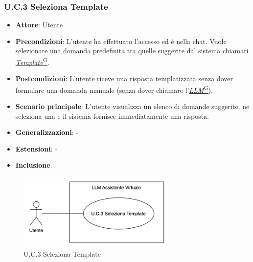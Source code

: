 \subsubsection{U.C.3 Seleziona Template}
\begin{itemize}
    \item \textbf{Attore}: Utente
    \item \textbf{Precondizioni}: L'utente ha effettuato l'accesso ed è nella chat. Vuole selezionare una domanda predefinita tra quelle suggerite dal sistema chiamati \href{https://code7crusaders.github.io/docs/RTB/documentazione_interna/glossario.html#template}{\textit{Template}\textsuperscript{G}}. 
    \item \textbf{Postcondizioni}: L'utente riceve una risposta templatizzata senza dover formulare una domanda manuale (senza dover chiamare l’\href{https://code7crusaders.github.io/docs/RTB/documentazione_interna/glossario.html#llm-large-language-model}{\textit{LLM}\textsuperscript{G}}).
    \item \textbf{Scenario principale}: L'utente visualizza un elenco di domande suggerite, ne seleziona una e il sistema fornisce immediatamente una risposta.
    \item \textbf{Generalizzazioni}: -
    \item \textbf{Estensioni}: -
    \item \textbf{Inclusione}: -
\end{itemize}
\begin{figure}[H]
    \centering
    \includegraphics[width=0.7\textwidth]{img/UC3.png}
    \caption{U.C.3 Seleziona Template}
\end{figure}
\newpage

